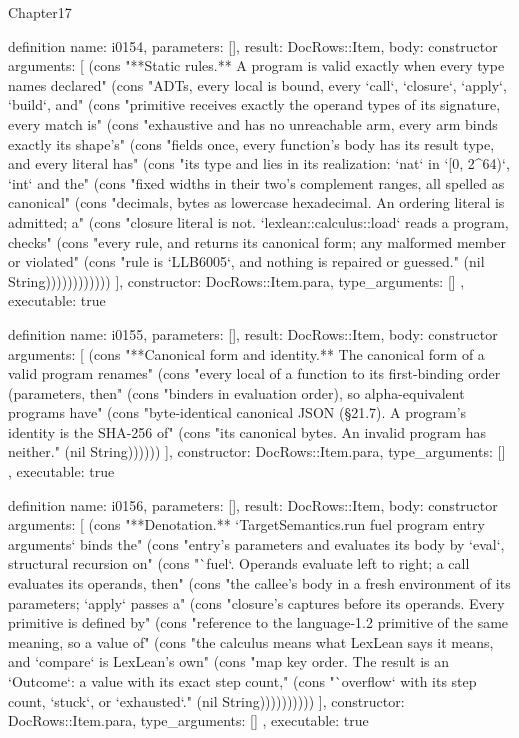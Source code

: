 \begin{lexlean}{Chapter17}
\begin{semanticmodule}
definition{
  name: i0154,
  parameters: [],
  result: DocRows::Item,
  body: constructor{
    arguments: [
      (cons "**Static rules.** A program is valid exactly when every type names declared" (cons "ADTs, every local is bound, every `call`, `closure`, `apply`, `build`, and" (cons "primitive receives exactly the operand types of its signature, every match is" (cons "exhaustive and has no unreachable arm, every arm binds exactly its shape's" (cons "fields once, every function's body has its result type, and every literal has" (cons "its type and lies in its realization: `nat` in `[0, 2^64)`, `int` and the" (cons "fixed widths in their two's complement ranges, all spelled as canonical" (cons "decimals, bytes as lowercase hexadecimal. An ordering literal is admitted; a" (cons "closure literal is not. `lexlean::calculus::load` reads a program, checks" (cons "every rule, and returns its canonical form; any malformed member or violated" (cons "rule is `LLB6005`, and nothing is repaired or guessed." (nil String))))))))))))
    ],
    constructor: DocRows::Item.para,
    type_arguments: []
  },
  executable: true
}

definition{
  name: i0155,
  parameters: [],
  result: DocRows::Item,
  body: constructor{
    arguments: [
      (cons "**Canonical form and identity.** The canonical form of a valid program renames" (cons "every local of a function to its first-binding order (parameters, then" (cons "binders in evaluation order), so alpha-equivalent programs have" (cons "byte-identical canonical JSON (§21.7). A program's identity is the SHA-256 of" (cons "its canonical bytes. An invalid program has neither." (nil String))))))
    ],
    constructor: DocRows::Item.para,
    type_arguments: []
  },
  executable: true
}

definition{
  name: i0156,
  parameters: [],
  result: DocRows::Item,
  body: constructor{
    arguments: [
      (cons "**Denotation.** `TargetSemantics.run fuel program entry arguments` binds the" (cons "entry's parameters and evaluates its body by `eval`, structural recursion on" (cons "`fuel`. Operands evaluate left to right; a call evaluates its operands, then" (cons "the callee's body in a fresh environment of its parameters; `apply` passes a" (cons "closure's captures before its operands. Every primitive is defined by" (cons "reference to the language-1.2 primitive of the same meaning, so a value of" (cons "the calculus means what LexLean says it means, and `compare` is LexLean's own" (cons "map key order. The result is an `Outcome`: a value with its exact step count," (cons "`overflow` with its step count, `stuck`, or `exhausted`." (nil String))))))))))
    ],
    constructor: DocRows::Item.para,
    type_arguments: []
  },
  executable: true
}


\end{semanticmodule}
\end{lexlean}

